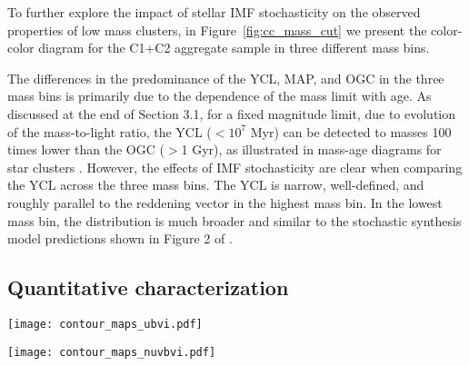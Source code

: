 \documentclass[]{aastex631}
\begin{document}
To further explore the impact of stellar IMF stochasticity on the observed properties of low mass clusters, in Figure~\ref{fig:cc_mass_cut} we present the color-color diagram for the C1+C2 aggregate sample in three different mass bins.

The differences in the predominance of the YCL, MAP, and OGC in the three mass bins is primarily due to the dependence of the mass limit with age. As discussed at the end of Section 3.1, for a fixed magnitude limit, due to evolution of the mass-to-light ratio, the YCL ($<10^7$ Myr) can be detected to masses 100 times lower than the OGC ($>$1 Gyr), as illustrated in mass-age diagrams for star clusters \citep[e.g.,][]{cook_star_2019}.
However, the effects of IMF stochasticity are clear when comparing the YCL across the three mass bins.  The YCL is narrow, well-defined, and roughly parallel to the reddening vector in the highest mass bin.  In the lowest mass bin, the distribution is much broader and similar to the stochastic synthesis model predictions shown in Figure 2 of \citet{fouesneau_analyzing_2012}.

\subsection{Quantitative characterization}\label{ssect:cc_regions}
%
\begin{figure*} 
\texttt{[image: contour\_maps\_ubvi.pdf]}
 \caption{Characteristic regions in U-B vs V-I color-color diagrams of C1 and C2 clusters and C3 compact associations.
 We show human and ML classified samples in the top and bottom row, respectively.
 We compute the color-color maps by stacking each cluster as a normalized Gaussian function on a grid using the color uncertainties as standard deviations. 
 We then identify the YCL (blue) and the MAP (green) as the contour lines encircling 50\,\% of the highest point for C1 clusters and C3 compact associations, respectively. We then find the largest contour line which only encircles the OGC (red), separating this region from the MAP. We show the hulls of all three regions for C2 clusters.
 In order to compare the slope of the reddening vector and the sequence of dust-reddened objects in the YCL, we fit a linear function to all C3 compact association which are inside the blue segmented area.
 }
 \label{fig:color_color_regions}
\end{figure*}
%
\begin{figure*} 
\texttt{[image: contour\_maps\_nuvbvi.pdf]}
 \caption{Same as Figure\,\ref{fig:color_color_regions} but with NUV-B colors on the \textit{y}-axis.}
 \label{fig:color_color_regions_nuvb}
\end{figure*}
\end{document}
